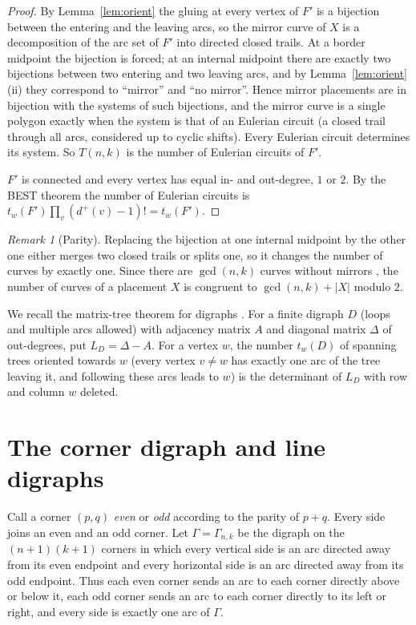 \documentclass[11pt,a4paper]{amsart}
\theoremstyle{remark}
\newtheorem{remark}[theorem]{Remark}
\newcommand{\G}{\Gamma}
\newcommand{\dout}{d^{+}}
\begin{document}
\begin{proof}
By Lemma~\ref{lem:orient} the gluing at every vertex of $F'$ is a bijection between the entering and the leaving
arcs, so the mirror curve of $X$ is a decomposition of the arc set of $F'$ into directed closed trails. At a border
midpoint the bijection is forced; at an internal midpoint there are exactly two bijections between two entering
and two leaving arcs, and by Lemma~\ref{lem:orient}(ii) they correspond to ``mirror'' and ``no mirror''. Hence
mirror placements are in bijection with the systems of such bijections, and the mirror curve is a single polygon
exactly when the system is that of an Eulerian circuit (a closed trail through all arcs, considered up to cyclic
shifts). Every Eulerian circuit determines its system. So $T(n,k)$ is the number of Eulerian circuits of $F'$.

$F'$ is connected and every vertex has equal in- and out-degree, $1$ or $2$. By the BEST theorem
\cite{AEB,TS} the number of Eulerian circuits is $t_w(F')\prod_v(\dout(v)-1)!=t_w(F')$.
\end{proof}

\begin{remark}[Parity]\label{rem:parity}
Replacing the bijection at one internal midpoint by the other one either merges two closed trails or splits one,
so it changes the number of curves by exactly one. Since there are $\gcd(n,k)$ curves without mirrors
\cite{FM,Gerdes,JRSZ}, the number of curves of a placement $X$ is congruent to $\gcd(n,k)+|X|$ modulo $2$.
\end{remark}

We recall the matrix-tree theorem for digraphs \cite{Tutte}. For a finite digraph $D$ (loops and multiple arcs
allowed) with adjacency matrix $A$ and diagonal matrix $\Delta$ of out-degrees, put $L_D=\Delta-A$. For a vertex
$w$, the number $t_w(D)$ of spanning trees oriented towards $w$ (every vertex $v\ne w$ has exactly one arc of the
tree leaving it, and following these arcs leads to $w$) is the determinant of $L_D$ with row and column $w$
deleted.

\section{The corner digraph and line digraphs}\label{sec:line}

Call a corner $(p,q)$ \emph{even} or \emph{odd} according to the parity of $p+q$. Every side joins an even and an
odd corner. Let $\G=\G_{n,k}$ be the digraph on the $(n+1)(k+1)$ corners in which every vertical side is an arc
directed away from its even endpoint and every horizontal side is an arc directed away from its odd endpoint.
Thus each even corner sends an arc to each corner directly above or below it, each odd corner sends an arc to each
corner directly to its left or right, and every side is exactly one arc of $\G$.
\end{document}
